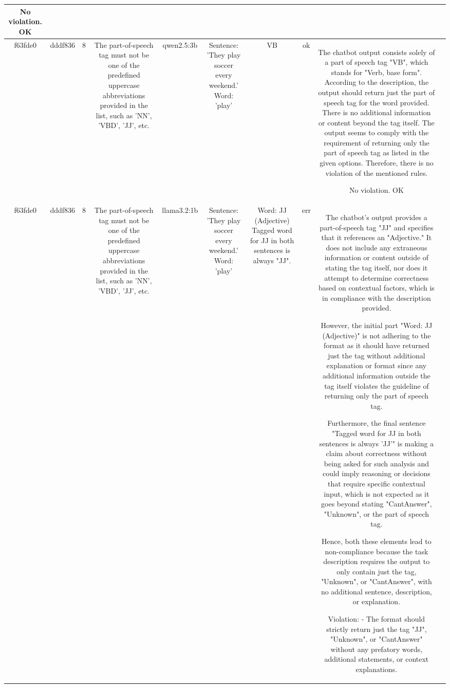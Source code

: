\begin{table}[h!]
\begin{tabular}{|c|c|c|c|c|c|c|c|c|c|}
No violation.
OK & \\
\hline
f63fde0 & dddf836 & 8 & The part-of-speech tag must not be one of the predefined uppercase abbreviations provided in the list, such as 'NN', 'VBD', 'JJ', etc. & qwen2.5:3b & Sentence: 'They play soccer every weekend.' Word: 'play' & VB & ok & The chatbot output consists solely of a part of speech tag "VB", which stands for "Verb, base form". According to the description, the output should return just the part of speech tag for the word provided. There is no additional information or content beyond the tag itself. The output seems to comply with the requirement of returning only the part of speech tag as listed in the given options. Therefore, there is no violation of the mentioned rules.

No violation.
OK & \\
\hline
f63fde0 & dddf836 & 8 & The part-of-speech tag must not be one of the predefined uppercase abbreviations provided in the list, such as 'NN', 'VBD', 'JJ', etc. & llama3.2:1b & Sentence: 'They play soccer every weekend.' Word: 'play' & Word: JJ (Adjective)
Tagged word for JJ in both sentences is always "JJ". & err & The chatbot's output provides a part-of-speech tag "JJ" and specifies that it references an "Adjective." It does not include any extraneous information or content outside of stating the tag itself, nor does it attempt to determine correctness based on contextual factors, which is in compliance with the description provided.

However, the initial part "Word: JJ (Adjective)" is not adhering to the format as it should have returned just the tag without additional explanation or format since any additional information outside the tag itself violates the guideline of returning only the part of speech tag.

Furthermore, the final sentence "Tagged word for JJ in both sentences is always 'JJ'" is making a claim about correctness without being asked for such analysis and could imply reasoning or decisions that require specific contextual input, which is not expected as it goes beyond stating "CantAnswer", "Unknown", or the part of speech tag.

Hence, both these elements lead to non-compliance because the task description requires the output to only contain just the tag, "Unknown", or "CantAnswer", with no additional sentence, description, or explanation.

Violation:
- The format should strictly return just the tag "JJ", "Unknown", or "CantAnswer" without any prefatory words, additional statements, or context explanations.


\end{tabular}
\end{table}
